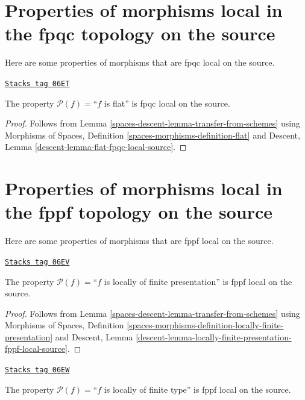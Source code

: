 \section{Properties of morphisms local in the fpqc topology on the source}
\label{spaces-descent-section-fpqc-local-source}
Here are some properties of morphisms that are fpqc local on the source.

\begin{lemma}
\label{spaces-descent-lemma-flat-fpqc-local-source}
\href{https://stacks.math.columbia.edu/tag/06ET}{\texttt{Stacks tag 06ET}}

The property $\mathcal{P}(f)=$``$f$ is flat'' is fpqc local on the source.
\end{lemma}

\begin{proof}
Follows from
Lemma \ref{spaces-descent-lemma-transfer-from-schemes}
using
Morphisms of Spaces, Definition \ref{spaces-morphisms-definition-flat}
and
Descent, Lemma \ref{descent-lemma-flat-fpqc-local-source}.
\end{proof}

\section{Properties of morphisms local in the fppf topology on the source}
\label{spaces-descent-section-fppf-local-source}
Here are some properties of morphisms that are fppf local on the source.

\begin{lemma}
\label{spaces-descent-lemma-locally-finite-presentation-fppf-local-source}
\href{https://stacks.math.columbia.edu/tag/06EV}{\texttt{Stacks tag 06EV}}

The property $\mathcal{P}(f)=$``$f$ is locally of finite presentation''
is fppf local on the source.
\end{lemma}

\begin{proof}
Follows from
Lemma \ref{spaces-descent-lemma-transfer-from-schemes}
using
Morphisms of Spaces,
Definition \ref{spaces-morphisms-definition-locally-finite-presentation}
and
Descent,
Lemma \ref{descent-lemma-locally-finite-presentation-fppf-local-source}.
\end{proof}

\begin{lemma}
\label{spaces-descent-lemma-locally-finite-type-fppf-local-source}
\href{https://stacks.math.columbia.edu/tag/06EW}{\texttt{Stacks tag 06EW}}

The property $\mathcal{P}(f)=$``$f$ is locally of finite type''
is fppf local on the source.
\end{lemma}


